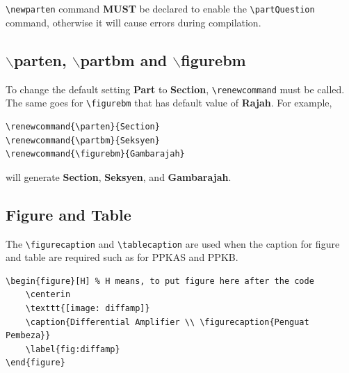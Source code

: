 \documentclass[12pt]{article}
\begin{document}
\begin{framed}
	\setcounter{counterpart}{0}
	
	\\
	
	\partQuestion{}
	
	\partQuestion{}
	
	
	\\
	
	\partQuestion{}
	
	\partQuestion{}
	
\end{framed}

\verb|\newparten| command \textbf{MUST} be declared to enable the \verb|\partQuestion| command, otherwise it will cause errors during compilation. 

\subsection{$\backslash$parten, $\backslash$partbm and $\backslash$figurebm}
To change the default setting \textbf{Part} to \textbf{Section}, \verb|\renewcommand| must be called. The same goes for \verb|\figurebm| that has default value of \textbf{Rajah}. For example, 

\begin{lstlisting}[basicstyle=\footnotesize, frame=single]
\renewcommand{\parten}{Section}
\renewcommand{\partbm}{Seksyen}
\renewcommand{\figurebm}{Gambarajah}
\end{lstlisting}

will generate \textbf{Section}, \textbf{Seksyen}, and \textbf{Gambarajah}. 

\subsection{Figure and Table}

The \verb|\figurecaption| and \verb|\tablecaption| are used when the caption for figure and table are required such as for PPKAS and PPKB. 

\begin{lstlisting}[basicstyle=\footnotesize, frame=single]
\begin{figure}[H] % H means, to put figure here after the code
	\centerin
	\texttt{[image: diffamp]}
	\caption{Differential Amplifier \\ \figurecaption{Penguat Pembeza}}
	\label{fig:diffamp}
\end{figure}
\end{lstlisting}
\end{document}
